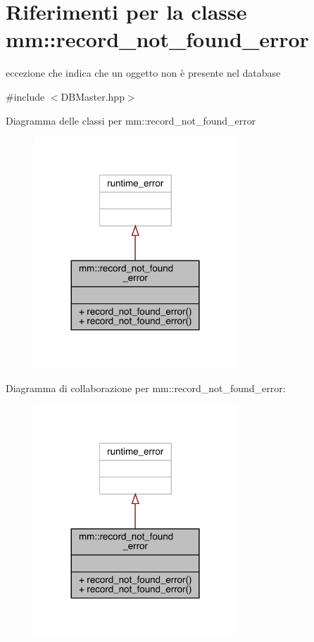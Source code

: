 \hypertarget{classmm_1_1record__not__found__error}{}\section{Riferimenti per la classe mm\+:\+:record\+\_\+not\+\_\+found\+\_\+error}
\label{classmm_1_1record__not__found__error}


eccezione che indica che un oggetto non è presente nel database  




{\ttfamily \#include $<$D\+B\+Master.\+hpp$>$}



Diagramma delle classi per mm\+:\+:record\+\_\+not\+\_\+found\+\_\+error
\nopagebreak
\begin{figure}[H]
\begin{center}
\leavevmode
\includegraphics[width=216pt]{dc/dd2/classmm_1_1record__not__found__error__inherit__graph}
\end{center}
\end{figure}


Diagramma di collaborazione per mm\+:\+:record\+\_\+not\+\_\+found\+\_\+error\+:
\nopagebreak
\begin{figure}[H]
\begin{center}
\leavevmode
\includegraphics[width=216pt]{da/d69/classmm_1_1record__not__found__error__coll__graph}
\end{center}
\end{figure}
